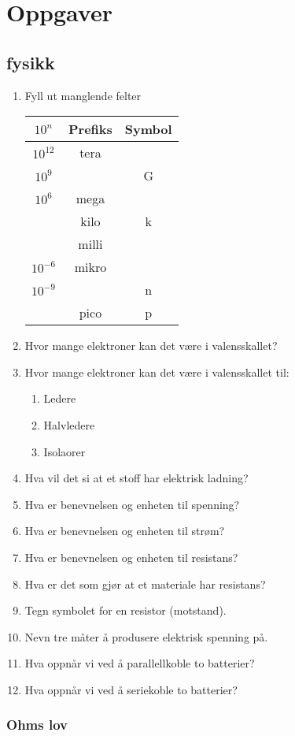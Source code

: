 \documentclass[12pt,a4paper]{article}
\providecommand{\tabularnewline}{\\}
\begin{document}
\section{Oppgaver}
\subsection{fysikk}
\begin{enumerate}
\item Fyll ut manglende felter\\
\begin{tabular}{|c|c|c|}
\hline 
$10^{n}$ & Prefiks  & Symbol\tabularnewline
\hline 
\hline 
$10^{12}$ & tera & \tabularnewline
\hline 
$10^{9}$ &  & G\tabularnewline
\hline 
$10^{6}$ & mega & \tabularnewline
\hline 
 & kilo  & k\tabularnewline
\hline 
 & milli  & \tabularnewline
\hline 
$10^{-6}$ & mikro  & \textmu{}\tabularnewline
\hline 
$10^{-9}$ &  & n\tabularnewline
\hline 
 & pico  & p\tabularnewline
\hline 
\end{tabular}
\item Hvor mange elektroner kan det være i valensskallet?
\item Hvor mange elektroner kan det være i valensskallet til:

\begin{enumerate}
\item Ledere
\item Halvledere 
\item Isolaorer 
\end{enumerate}
\item Hva vil det si at et stoff har elektrisk ladning?
\item Hva er benevnelsen og enheten til spenning?
\item Hva er benevnelsen og enheten til strøm?
\item Hva er benevnelsen og enheten til resistans?
\item Hva er det som gjør at et materiale har resistans?
\item Tegn symbolet for en resistor (motstand).
\item Nevn tre måter å produsere elektrisk spenning på. 
\item Hva oppnår vi ved å parallellkoble to batterier?
\item Hva oppnår vi ved å seriekoble to batterier?
\end{enumerate}

\subsubsection{Ohms lov}
\end{document}
